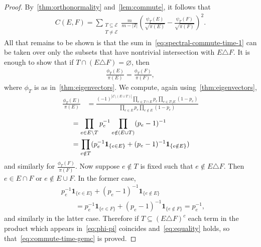 \documentclass[11pt,a4paper]{article}
\begin{document}
\begin{proof}
    By~\cref{thm:orthonormality} and~\cref{lem:commute}, it follows that
        \begin{align}\label{eq:spectral-commute-time-1}
            C(E,F)=\sum_{\substack{T\subseteq \mathcal{E}\\ T\neq\mathcal{E}}}\frac{m}{m-|T|}\left(\frac{\psi_T(E)}{\sqrt{\pi(E)}}-\frac{\psi_T(F)}{\sqrt{\pi(F)}}\right)^2.
        \end{align}
    All that remains to be shown is that the sum in~\cref{eq:spectral-commute-time-1} can be taken over only the subsets that have nontrivial intersection with $E\triangle F$. It is enough to show that if $T\cap (E\triangle F) = \varnothing$, then 
        \begin{align}\label{eq:equality}
            \frac{\phi_T(E)}{\pi(E)}=\frac{\phi_T(F)}{{\pi(F)}},
        \end{align}
    where $\phi_T$ is as in~\cref{thm:eigenvectors}. We compute, again using~\cref{thm:eigenvectors}, 
        \begin{align*}
            \frac{\phi_T(E)}{\pi(E)} &= \frac{(-1)^{|\mathcal{E}\setminus(E\cup T)|}\prod_{e\in T\cap E}p_e \prod_{e\in T\setminus E}(1-p_e)}{\prod_{e\in E}p_e \prod_{e\notin E}(1-p_e)}
        \end{align*}
        \begin{align}\label{eq:phi-pi}
            &= {\prod_{e\in E\setminus T}p_e^{-1} \prod_{e\notin (E\cup T)}(p_e-1)^{-1}}\notag\\
            &= \prod_{e\notin T} (p_e^{-1} \mathbf{1}_{\{e\in E\}} + (p_e-1)^{-1} \mathbf{1}_{\{e\notin E\}} )
        \end{align}
    and similarly for $\frac{\phi_T(F)}{\pi(F)}$. Now suppose $e\notin T$ is fixed such that $e\notin E\triangle F$. Then $e\in E\cap F$ or $e\notin E\cup F$. In the former case,
        \begin{align*}
            &p_e^{-1} \mathbf{1}_{\{e\in E\}} + (p_e-1)^{-1} \mathbf{1}_{\{e\notin E\}}\\
            &\qquad= p_e^{-1} \mathbf{1}_{\{e\in F\}} + (p_e-1)^{-1} \mathbf{1}_{\{e\notin F\}}= p_e^{-1},
        \end{align*}
    and similarly in the latter case. Therefore if $T\subseteq (E\triangle F)^c $ each term in the product which appears in~\cref{eq:phi-pi} coincides and~\cref{eq:equality} holds, so that~\cref{eq:commute-time-gemc} is proved.
\end{proof}
\end{document}
